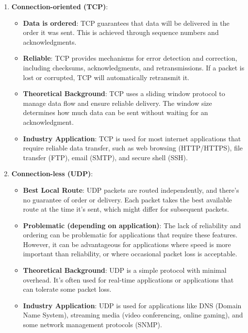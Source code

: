 \begin{enumerate}
    \item \textbf{Connection-oriented (TCP)}:
        \begin{itemize}
            \item \textbf{Data is ordered}:  TCP guarantees that data will be delivered in the order it was sent.  This is achieved through sequence numbers and acknowledgments.
            \item \textbf{Reliable}: TCP provides mechanisms for error detection and correction, including checksums, acknowledgments, and retransmissions.  If a packet is lost or corrupted, TCP will automatically retransmit it.
            \item \textbf{Theoretical Background}: TCP uses a sliding window protocol to manage data flow and ensure reliable delivery.  The window size determines how much data can be sent without waiting for an acknowledgment.
            \item \textbf{Industry Application}:  TCP is used for most internet applications that require reliable data transfer, such as web browsing (HTTP/HTTPS), file transfer (FTP), email (SMTP), and secure shell (SSH).
        \end{itemize}
    \item \textbf{Connection-less (UDP)}:
        \begin{itemize}
            \item \textbf{Best Local Route}: UDP packets are routed independently, and there's no guarantee of order or delivery.  Each packet takes the best available route at the time it's sent, which might differ for subsequent packets.
            \item \textbf{Problematic (depending on application)}: The lack of reliability and ordering can be problematic for applications that require these features.  However, it can be advantageous for applications where speed is more important than reliability, or where occasional packet loss is acceptable.
            \item \textbf{Theoretical Background}: UDP is a simple protocol with minimal overhead.  It's often used for real-time applications or applications that can tolerate some packet loss.
            \item \textbf{Industry Application}: UDP is used for applications like DNS (Domain Name System), streaming media (video conferencing, online gaming), and some network management protocols (SNMP).
        \end{itemize}
\end{enumerate}

